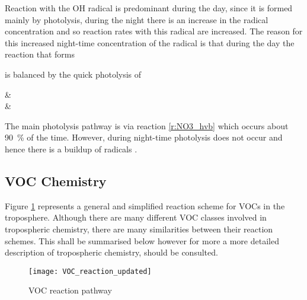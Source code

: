 Reaction with the OH radical is predominant during the day, since it is formed mainly by photolysis, during the night there is an increase in the  radical concentration and so reaction rates with this radical are increased. 
The reason for this increased night-time concentration of the  radical is that during the day the reaction that forms  
\begin{rxnarray}
     \rightarrow {}
\end{rxnarray}
is balanced by the quick photolysis of 
\begin{rxnarray}
     & \rightarrow {} \label{r:NO3_hva} \\
     & \rightarrow {} \label{r:NO3_hvb} 
\end{rxnarray}
The main photolysis pathway is via reaction \eqref{r:NO3_hvb} which occurs about 90~\% of the time.
However, during night-time photolysis does not occur and hence there is a buildup of  radicals \citep{Atkinson:1990, Atkinson:2000}.

\subsection{VOC Chemistry}
Figure \ref{f:VOC_reaction} represents a general and simplified reaction scheme for VOCs in the troposphere. 
Although there are many different VOC classes involved in tropospheric chemistry, there are many similarities between their reaction schemes. 
This shall be summarised below however for more a more detailed description of tropospheric chemistry, \citep{Atkinson:2000} should be consulted. 
\begin{figure}
    \begin{center}
        \texttt{[image: VOC\_reaction\_updated]}
        \caption[what is this]{VOC reaction pathway}
        \label{f:VOC_reaction}
    \end{center}
\end{figure}

